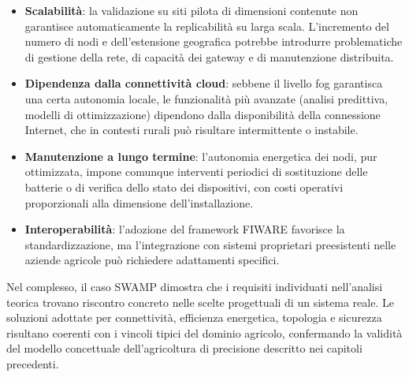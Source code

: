 \begin{itemize}
	\item \textbf{Scalabilità}: la validazione su siti pilota di dimensioni contenute non garantisce automaticamente la replicabilità su larga scala. L'incremento del numero di nodi e dell'estensione geografica potrebbe introdurre problematiche di gestione della rete, di capacità dei gateway e di manutenzione distribuita.
	
	\item \textbf{Dipendenza dalla connettività cloud}: sebbene il livello fog garantisca una certa autonomia locale, le funzionalità più avanzate (analisi predittiva, modelli di ottimizzazione) dipendono dalla disponibilità della connessione Internet, che in contesti rurali può risultare intermittente o instabile.
	
	\item \textbf{Manutenzione a lungo termine}: l'autonomia energetica dei nodi, pur ottimizzata, impone comunque interventi periodici di sostituzione delle batterie o di verifica dello stato dei dispositivi, con costi operativi proporzionali alla dimensione dell'installazione.
	
	\item \textbf{Interoperabilità}: l'adozione del framework FIWARE favorisce la standardizzazione, ma l'integrazione con sistemi proprietari preesistenti nelle aziende agricole può richiedere adattamenti specifici.
\end{itemize}

\noindent Nel complesso, il caso SWAMP dimostra che i requisiti individuati nell'analisi teorica trovano riscontro concreto nelle scelte progettuali di un sistema reale. Le soluzioni adottate per connettività, efficienza energetica, topologia e sicurezza risultano coerenti con i vincoli tipici del dominio agricolo, confermando la validità del modello concettuale dell'agricoltura di precisione descritto nei capitoli precedenti.